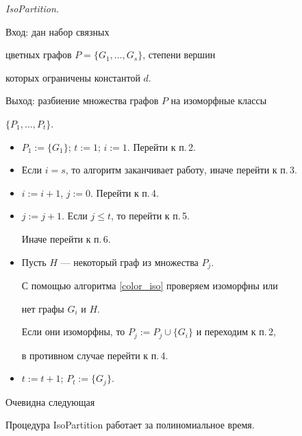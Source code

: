 \begin{algs}


{\it IsoPartition.}\label{partition}





Вход: дан набор связных


цветных графов $P=\{G_1, \dotsc, G_s\}$, степени вершин


которых ограничены константой $d$. %





Выход: разбиение множества графов $P$ на изоморфные классы


$\{P_1,\dotsc, P_t\}$.


\begin{itemize}


\item[1.] $P_1:=\{G_1\}$; $t:=1$; $i:=1$. Перейти к п.\,2.


\item[2.] Если $i=s$, то алгоритм заканчивает работу, иначе перейти к п.\,3.


\item[3.] $i:=i+1$, $j:=0$. Перейти к п.\,4.


\item[4.] $j:=j+1$. Если $j\le t$, то перейти к п.\,5.


Иначе перейти к п.\,6.


\item[5.] Пусть $H$ --- некоторый граф из множества $P_j$.


С помощью алгоритма \ref{color_iso} проверяем изоморфны или


нет графы $G_i$ и $H$.


Если они изоморфны, то $P_j:=P_j\cup \{G_i\}$ и переходим к п.\,2,


в противном случае перейти к п.\,4.


\item[6.] $t:=t+1$; $P_t:=\{G_j\}$.


\end{itemize}


\end{algs}





Очевидна следующая





\begin{thms}


Процедура IsoPartition работает за полиномиальное время.


\end{thms}








